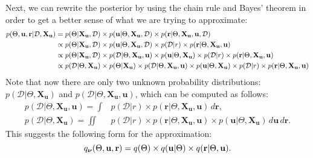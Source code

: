 \documentclass{mprop}
\theoremstyle{definition}
\begin{document}
Next, we can rewrite the posterior by using the chain rule and Bayes' theorem in
order to get a better sense of what we are trying to approximate:
\[
  \begin{split}
    p(\Theta, \mathbf{u}, \mathbf{r} | \mathcal{D}, \mathbf{X_u}) &= p(\Theta | \mathbf{X_u}, \mathcal{D}) \times p(\mathbf{u} |
    \Theta, \mathbf{X_u}, \mathcal{D}) \times p(\mathbf{r} | \Theta,
    \mathbf{X_u}, \mathbf{u}, \mathcal{D}) \\
    &\propto p(\Theta | \mathbf{X_u}, \mathcal{D}) \times p(\mathbf{u} | \Theta,
    \mathbf{X_u}, \mathcal{D}) \times p(\mathcal{D} | r) \times p(\mathbf{r} |
    \Theta, \mathbf{X_u}, \mathbf{u}) \\
    &\propto p(\Theta | \mathbf{X_u}, \mathcal{D}) \times p(\mathcal{D} |
    \Theta, \mathbf{X_u}, \mathbf{u}) \times p(\mathbf{u} | \Theta,
    \mathbf{X_u}) \times p(\mathcal{D} | r) \times p(\mathbf{r} | \Theta,
    \mathbf{X_u}, \mathbf{u}) \\
    &\propto p(\mathcal{D} | \Theta, \mathbf{X_u}) \times p(\Theta |
    \mathbf{X_u}) \times p(\mathcal{D} | \Theta, \mathbf{X_u}, \mathbf{u})
    \times p(\mathbf{u} | \Theta, \mathbf{X_u}) \times p(\mathcal{D} | r) \times
    p(\mathbf{r} | \Theta, \mathbf{X_u}, \mathbf{u})
  \end{split}
\]
Note that now there are only two unknown probability distributions:
$p(\mathcal{D} | \Theta, \mathbf{X_u})$ and $p(\mathcal{D} | \Theta,
\mathbf{X_u}, \mathbf{u})$, which can be computed as follows:
\begin{align*}
  p(\mathcal{D} | \Theta, \mathbf{X_u}, \mathbf{u}) = \int &p(\mathcal{D} | r) \times p(\mathbf{r} | \Theta, \mathbf{X_u}, \mathbf{u}) \, d\mathbf{r}, \\
  p(\mathcal{D} | \Theta, \mathbf{X_u}) = \iint &p(\mathcal{D} | r) \times p(\mathbf{r} | \Theta, \mathbf{X_u}, \mathbf{u}) \times p(\mathbf{u} | \Theta, \mathbf{X_u}) \, d\mathbf{u} \, d\mathbf{r}.
\end{align*}
This suggests the following form for the approximation:
\begin{equation} \label{eq:approximation}
  q_{\bm\nu}(\Theta, \mathbf{u}, \mathbf{r}) = q(\Theta) \times q(\mathbf{u} | \Theta) \times q(\mathbf{r}
  | \Theta, \mathbf{u}).
\end{equation}

\end{document}
